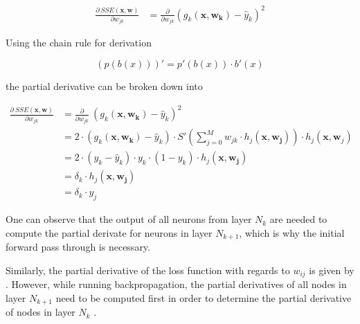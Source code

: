 \begin{equation}
    \begin{split}
        \frac{\partial ~ SSE(\bm{x}, \bm{w})}{\partial w_{jk}}
        &= \frac{\partial}{\partial w_{jk}} (g_k(\bm{x},\bm{w_k}) - \hat{y}_{k})^2
    \end{split}
\end{equation}

Using the chain rule for derivation 

\begin{equation}
    (p(b(x)))' = p'(b(x)) \cdot b'(x)
\end{equation}

the partial derivative can be broken down into 

\begin{equation}
    \begin{split}
        \frac{\partial ~ SSE(\bm{x}, \bm{w})}{\partial w_{jk}}
        &= \frac{\partial}{\partial w_{jk}} ~ (g_k(\bm{x},\bm{w_k}) - \hat{y}_{k})^2 \\
        &= 2 \cdot (g_k(\bm{x},\bm{w_k}) - \hat{y}_{k}) \cdot  S'\left(\sum_{j=0}^M w_{jk} \cdot h_j(\bm{x}, \bm{w_j})\right) \cdot h_j(\bm{x}, \bm{w}_j) \\
        &= 2 \cdot (y_k - \hat{y}_{k}) \cdot  y_k \cdot (1 - y_k) \cdot h_j(\bm{x}, \bm{w_j}) \\
        &= \delta_k \cdot h_j(\bm{x}, \bm{w_j}) \\
        &= \delta_k \cdot y_j
    \end{split}
\end{equation}

One can observe that the output of all neurons from layer $N_{k}$ are needed to compute the partial derivate for neurons in layer $N_{k+1}$, which is why the initial forward pass through is necessary.

Similarly, the partial derivative of the loss function with regards to $w_{ij}$ is given by . 
However, while running backpropagation, the partial derivatives of all nodes in layer $N_{k+1}$ need to be computed first in order to determine the partial derivative of nodes in layer $N_{k}$ \cite{rojas_neural_1996}.

